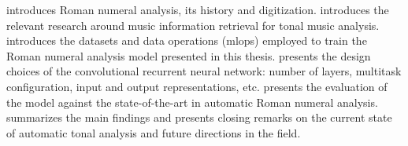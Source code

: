 
introduces Roman numeral analysis, its history and
digitization.  introduces the relevant
research around music information retrieval for tonal music
analysis.  introduces
the datasets and data operations (\gls{mlops}) employed to train
the Roman numeral analysis model presented in this thesis.
 presents the design choices of the
convolutional recurrent neural network: number of layers,
multitask configuration, input and output representations,
etc.  presents the
evaluation of the model against the state-of-the-art in
automatic Roman numeral analysis. 
summarizes the main findings and presents closing remarks on
the current state of automatic tonal analysis and future
directions in the field.
